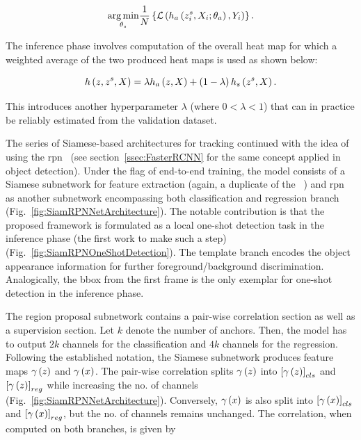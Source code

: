 \begin{equation}
    \label{eq:SNetModelTraining}
    \underset{\theta_s}{\operatorname*{arg\,min}}
    \frac{1}{N}
    \left\{ {
        {\mathcal{L}} \left( 
            {h_a} \left( {z}_{i}^{s}, X_i; \theta_a \right),
            Y_i
         \right)
    } \right\}.
\end{equation}

\noindent The inference phase involves computation of the overall heat map for which a weighted average of the two produced heat maps is used as shown below:

\begin{equation}
    {h} \left( z, z^s, X \right) = \lambda {h_a} \left( z, X \right) + \left( {1 - \lambda} \right) {h_s} \left( z^s, X \right).
\end{equation}

\noindent This introduces another hyperparameter $\lambda$ (where $0 < \lambda < 1$) that can in practice be reliably estimated from the validation dataset.

The series of Siamese-based architectures for tracking continued with the idea of using the \gls{rpn}~\cite{Li2018} (see section~\ref{ssec:FasterRCNN} for the same concept applied in object detection). Under the flag of end-to-end training, the  model consists of a Siamese subnetwork for feature extraction (again, a duplicate of the ~\cite{Bertinetto2016}) and \gls{rpn} as another subnetwork encompassing both classification and regression branch (Fig.~\ref{fig:SiamRPNNetArchitecture}). The notable contribution is that the proposed framework is formulated as a local one-shot detection task in the inference phase (the first work to make such a step) (Fig.~\ref{fig:SiamRPNOneShotDetection}). The template branch encodes the object appearance information for further foreground/background discrimination. Analogically, the \gls{bbox} from the first frame is the only exemplar for one-shot detection in the inference phase.

The region proposal subnetwork contains a pair-wise correlation section as well as a supervision section. Let $k$ denote the number of anchors. Then, the model has to output $2k$ channels for the classification and $4k$ channels for the regression. Following the established notation, the Siamese subnetwork produces feature maps ${\gamma} \left( z \right)$ and ${\gamma} \left( x \right)$. The pair-wise correlation splits ${\gamma} \left( z \right)$ into $\left[ {{\gamma} \left( z \right)} \right]_{cls}$ and $\left[ {{\gamma} \left( z \right)} \right]_{reg}$ while increasing the no. of channels (Fig.~\ref{fig:SiamRPNNetArchitecture}). Conversely, ${\gamma} \left( x \right)$ is also split into $\left[ {{\gamma} \left( x \right)} \right]_{cls}$ and $\left[ {{\gamma} \left( x \right)} \right]_{reg}$, but the no. of channels remains unchanged. The correlation, when computed on both branches, is given by


